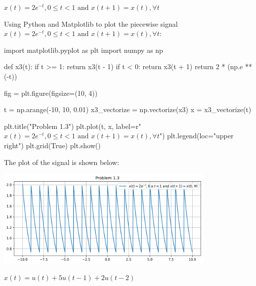 \documentclass[a4paper, 10pt]{article}
\begin{document}
\begin{tosubmit}
\begin{subproblems}[start=3]
    \item \( x(t) = 2e^{-t}, 0 \leq t < 1 \text{ and } x(t + 1) = x(t), \forall t \)
\end{subproblems}

\par\noindent\submitsolution
Using Python and Matplotlib to plot the piecewise signal \( x(t) = 2e^{-t}, 0 \leq t < 1 \text{ and } x(t + 1) = x(t), \forall t \):
\begin{codingbox}
import matplotlib.pyplot as plt
import numpy as np

def x3(t):
    if t >= 1:
        return x3(t - 1)
    if t < 0:
        return x3(t + 1)
    return 2 * (np.e ** (-t))

fig = plt.figure(figsize=(10, 4))

t = np.arange(-10, 10, 0.01)
x3_vectorize = np.vectorize(x3)
x = x3_vectorize(t)

plt.title("Problem 1.3")
plt.plot(t, x, label=r"$x(t) = 2e^{-t}, 0 \leq t < 1 \text{ and } x(t + 1) = x(t), \forall t$")
plt.legend(loc="upper right")
plt.grid(True)
plt.show()
\end{codingbox}

The plot of the signal is shown below:
\begin{center}
    \includegraphics[width=0.8\textwidth]{images/problem_1_3.png}
\end{center}
\end{tosubmit}

\newpage

\begin{subproblems}[start=4]
    \item \( x(t) = u(t) + 5u(t - 1) + 2u(t - 2) \)
\end{subproblems}
\end{document}
